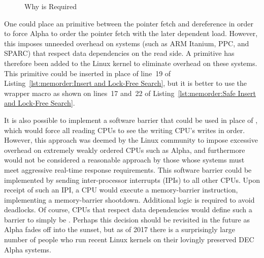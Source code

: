 \begin{figure}[tbp]
\centering
{}
\caption{Why  is Required}
\label{fig:memorder:Why smp-read-barrier-depends() is Required}
\end{figure}

One could place an  primitive
between the pointer fetch and dereference in order to force Alpha
to order the pointer fetch with the later dependent load.
However, this imposes unneeded overhead on systems (such as ARM
Itanium, PPC, and SPARC) that respect data dependencies on the read side.
A  primitive has therefore been added to the
Linux kernel to eliminate overhead on these systems.
This primitive could be inserted in place of line~19 of
Listing~\ref{lst:memorder:Insert and Lock-Free Search},
but it is better to use the  wrapper macro
as shown on lines~17 and~22 of
Listing~\ref{lst:memorder:Safe Insert and Lock-Free Search}.

It is also possible to implement a software barrier
that could be used in place of , which would force
all reading CPUs to see the writing CPU's writes in order.
However, this approach was deemed by the Linux community
to impose excessive overhead
on extremely weakly ordered CPUs such as Alpha, and furthermore would
not be considered a reasonable approach by those whose systems must meet
aggressive real-time response requirements.
This software barrier could be implemented by sending inter-processor
interrupts (IPIs) to all other CPUs.
Upon receipt of such an IPI, a CPU would execute a memory-barrier
instruction, implementing a memory-barrier shootdown.
Additional logic is required to avoid deadlocks.
Of course, CPUs that respect data dependencies would define such a barrier
to simply be .
Perhaps this decision should be revisited in the future as Alpha
fades off into the sunset, but as of 2017 there is a surprisingly
large number of people who run recent Linux kernels on their lovingly
preserved DEC Alpha systems.


